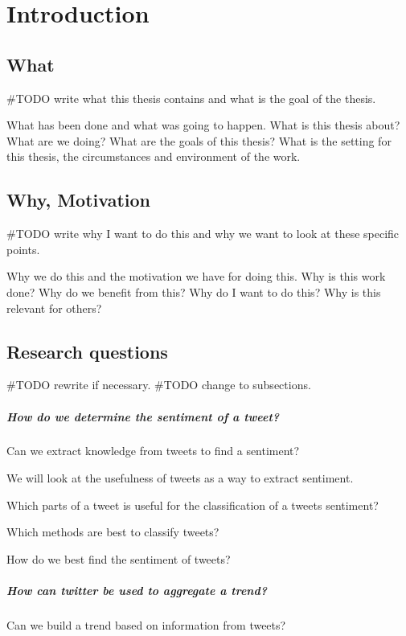 \chapter{Introduction}

\section{What}
#TODO write what this thesis contains and what is the goal of the thesis. 

What has been done and what was going to happen.
What is this thesis about? What are we doing? What are the goals of this
thesis? What is the setting for this thesis, the circumstances and environment
of the work. 

\section{Why, Motivation}
#TODO write why I want to do this and why we want to look at these specific
points. 

Why we do this and the motivation we have for doing this.
Why is this work done? Why do we benefit from this? Why do I want to do this?
Why is this relevant for others? 

\section{Research questions}
#TODO rewrite if necessary. 
#TODO change to subsections. 

\paragraph{How do we determine the sentiment of a tweet?\\}
Can we extract knowledge from tweets to find a sentiment?
	
We will look at the usefulness of tweets as a way to extract sentiment. 

Which parts of a tweet is useful for the classification of a tweets sentiment?

Which methods are best to classify tweets? 

How do we best find the sentiment of tweets?

\paragraph{How can twitter be used to aggregate a trend?\\}
Can we build a trend based on information from tweets? 
 
